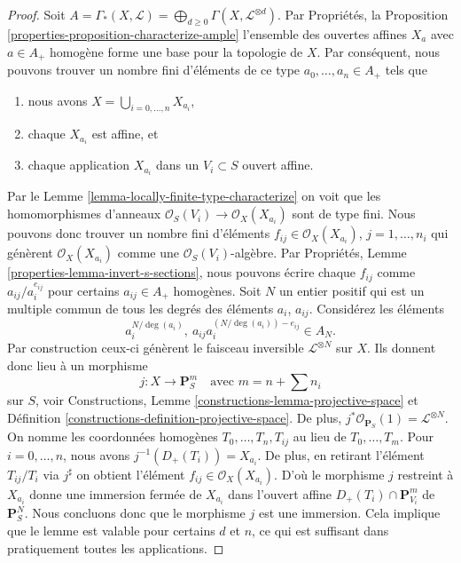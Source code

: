 \begin{proof}
Soit
$A = \Gamma_*(X, \mathcal{L}) =
\bigoplus_{d \geq 0} \Gamma(X, \mathcal{L}^{\otimes d})$. Par Propriétés,
la Proposition \ref{properties-proposition-characterize-ample} l'ensemble des ouvertes affines $X_a$ avec $a \in A_{+}$ homogène forme
une base pour la topologie de $X$. Par conséquent,
nous pouvons trouver un nombre fini
d'éléments de ce type $a_0, \ldots, a_n \in A_{+}$ tels que
\begin{enumerate}
\item nous avons $X = \bigcup_{i = 0, \ldots, n} X_{a_i}$,
\item chaque $X_{a_i}$ est affine, et
\item chaque application $X_{a_i}$ dans un $V_i \subset S$ ouvert affine.
\end{enumerate}
Par le Lemme \ref{lemma-locally-finite-type-characterize} on voit que les homomorphismes
d'anneaux $\mathcal{O}_S(V_i) \to \mathcal{O}_X(X_{a_i})$
sont de type fini. Nous pouvons donc
trouver un nombre fini d'éléments
$f_{ij} \in \mathcal{O}_X(X_{a_i})$, $j = 1, \ldots, n_i$ qui génèrent $\mathcal{O}_X(X_{a_i})$ comme une
$\mathcal{O}_S(V_i)$-algèbre. Par Propriétés, Lemme \ref{properties-lemma-invert-s-sections}, nous
pouvons écrire chaque $f_{ij}$ comme $a_{ij}/a_i^{e_{ij}}$
pour certains
$a_{ij} \in A_{+}$ homogènes. Soit $N$
un entier positif qui est un multiple commun de tous
les degrés des éléments $a_i$, $a_{ij}$.
Considérez les éléments
$$
a_i^{N/\deg(a_i)}, \ a_{ij}a_i^{(N/\deg(a_i)) - e_{ij}} \in A_N.
$$
Par construction ceux-ci génèrent le faisceau inversible
$\mathcal{L}^{\otimes N}$ sur $X$. Ils donnent donc lieu à
un morphisme
$$
j : X \longrightarrow
\mathbf{P}_S^{m}
\quad
\text{avec } m = n + \sum n_i
$$
sur $S$, voir Constructions, Lemme \ref{constructions-lemma-projective-space} et
Définition \ref{constructions-definition-projective-space}. De plus, $j^*\mathcal{O}_{\mathbf{P}_S}(1) = \mathcal{L}^{\otimes N}$. On
nomme les coordonnées homogènes $T_0, \ldots, T_n, T_{ij}$ au lieu
de $T_0, \ldots, T_m$. Pour $i = 0, \ldots, n$, nous avons $j^{-1}(D_{+}(T_i)) = X_{a_i}$.
De plus, en
retirant l'élément $T_{ij}/T_i$ via $j^\sharp$
on obtient l'élément $f_{ij} \in \mathcal{O}_X(X_{a_i})$. D'où le morphisme
$j$ restreint à $X_{a_i}$
donne une immersion fermée de $X_{a_i}$
dans l'ouvert affine $D_{+}(T_i) \cap \mathbf{P}^m_{V_i}$ de
$\mathbf{P}^N_S$. Nous concluons donc que le
morphisme $j$ est une immersion.
Cela implique que le lemme est valable pour certains $d$ et $n$, ce qui est suffisant
dans pratiquement toutes les applications.


\end{proof}
